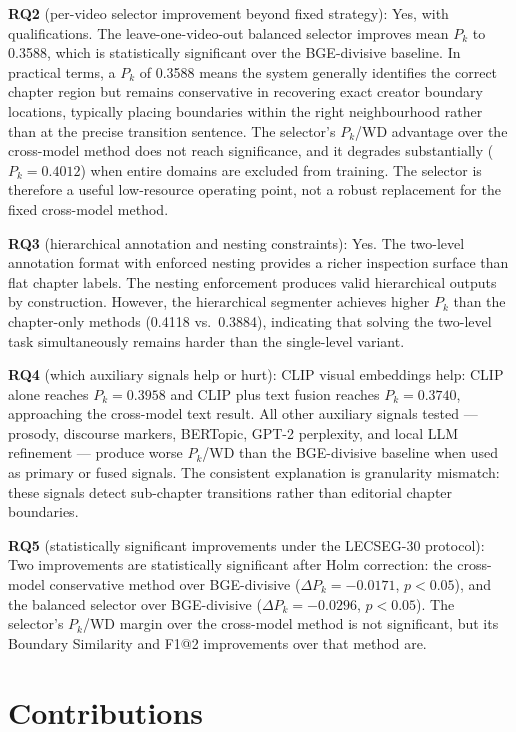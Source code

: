 \textbf{RQ2} (per-video selector improvement beyond fixed strategy):
Yes, with qualifications.
The leave-one-video-out balanced selector improves mean $P_k$ to 0.3588,
which is statistically significant over the BGE-divisive baseline.
In practical terms, a $P_k$ of 0.3588 means the system generally identifies
the correct chapter region but remains conservative in recovering exact creator
boundary locations, typically placing boundaries within the right neighbourhood
rather than at the precise transition sentence.
The selector's $P_k$/WD advantage over the cross-model method does not reach
significance, and it degrades substantially ($P_k=0.4012$) when entire domains
are excluded from training.
The selector is therefore a useful low-resource operating point, not a
robust replacement for the fixed cross-model method.

\textbf{RQ3} (hierarchical annotation and nesting constraints):
Yes.
The two-level annotation format with enforced nesting provides a richer
inspection surface than flat chapter labels.
The nesting enforcement produces valid hierarchical outputs by construction.
However, the hierarchical segmenter achieves higher $P_k$ than the
chapter-only methods (0.4118 vs.\ 0.3884), indicating that solving the
two-level task simultaneously remains harder than the single-level variant.

\textbf{RQ4} (which auxiliary signals help or hurt):
CLIP visual embeddings help: CLIP alone reaches $P_k=0.3958$ and CLIP plus
text fusion reaches $P_k=0.3740$, approaching the cross-model text result.
All other auxiliary signals tested --- prosody, discourse markers, BERTopic,
GPT-2 perplexity, and local LLM refinement --- produce worse $P_k$/WD than
the BGE-divisive baseline when used as primary or fused signals.
The consistent explanation is granularity mismatch: these signals detect
sub-chapter transitions rather than editorial chapter boundaries.

\textbf{RQ5} (statistically significant improvements under the LECSEG-30 protocol):
Two improvements are statistically significant after Holm correction:
the cross-model conservative method over BGE-divisive ($\Delta P_k=-0.0171$,
$p<0.05$), and the balanced selector over BGE-divisive ($\Delta P_k=-0.0296$,
$p<0.05$).
The selector's $P_k$/WD margin over the cross-model method is not significant,
but its Boundary Similarity and F1@2 improvements over that method are.

\section{Contributions}

